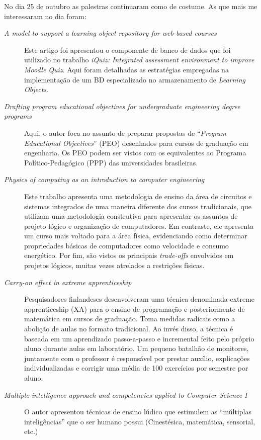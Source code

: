 \documentclass{article}
\begin{document}
No dia 25 de outubro as palestras continuaram como de costume. As que mais me interessaram no dia foram:

\begin{description}
	\item[\emph{A model to support a learning object repository for web-based courses}] Este artigo foi apresentou o componente de banco de dados que foi utilizado no trabalho \emph{iQuiz: Integrated assessment environment to improve Moodle Quiz}. Aqui foram detalhadas as estratégias empregadas na implementação de um BD especializado no armazenamento de \emph{Learning Objects}.
	\item[\emph{Drafting program educational objectives for undergraduate engineering degree programs}] Aqui, o autor foca no assunto de preparar propostas de ``\emph{Program Educational Objectives}'' (PEO) desenhados para cursos de graduação em engenharia. Os PEO podem ser vistos com os equivalentes ao Programa Político-Pedagógico (PPP) das universidades brasileiras. 
	\item[\emph{Physics of computing as an introduction to computer engineering}] Este trabalho apresenta uma metodologia de ensino da área de circuitos e sistemas integrados de uma maneira diferente dos cursos tradicionais, que utilizam uma metodologia construtiva para apresentar os assuntos de projeto lógico e organização de computadores. Em contraste, ele apresenta um curso mais voltado para a área física, evidenciando como determinar propriedades básicas de computadores como velocidade e consumo energético. Por fim, são vistos os principais \emph{trade-offs} envolvidos em projetos lógicos, muitas vezes atrelados a restrições físicas.
	\item[\emph{Carry-on effect in extreme apprenticeship}] Pesquisadores finlandeses desenvolveram uma técnica denominada extreme apprenticeship (XA) para o ensino de programação e posteriormente de matemática em cursos de graduação. Toma medidas radicais como a abolição de aulas no formato tradicional. Ao invés disso, a técnica é baseada em um aprendizado passo-a-passo e incremental feito pelo próprio aluno durante aulas em laboratório. Um pequeno batalhão de monitores, juntamente com o professor é responsável por prestar auxílio, explicações individualizadas e corrigir uma média de 100 exercícios por semestre por aluno.
	\item[\emph{Multiple intelligence approach and competencies applied to Computer Science I}] O autor apresentou técnicas de ensino lúdico que estimulem as ``múltiplas inteligências'' que o ser humano possui (Cinestésica, matemática, sensorial, etc.)
\end{description}
\end{document}
